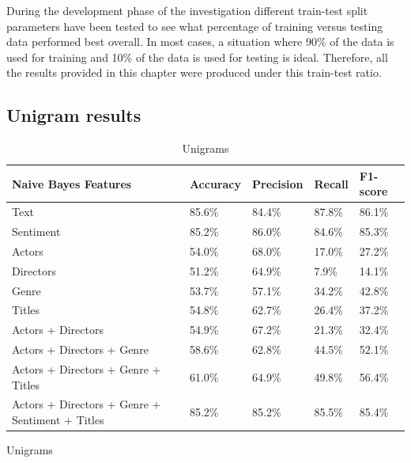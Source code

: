 \documentclass[
10pt, %
a4paper, %
oneside, %
headinclude,footinclude, %
] {book}%
\begin{document}
During the development phase of the investigation different train-test split parameters have been tested to see what percentage of training versus testing data performed best overall. In most cases, a situation where 90\% of the data is used for training and 10\% of the data is used for testing is ideal. Therefore, all the results provided in this chapter were produced under this train-test ratio.

\subsection{Unigram results}

\begin{table}[hbtp]
\centering
\caption{Unigrams}
\label{Table 1}
\begin{tabular}{@{}lllll@{}}
\toprule
Naive Bayes Features                          & Accuracy & Precision & Recall & F1-score \\ \midrule
Text                              & 85.6\%       & 84.4\%          & 87.8\%       & 86.1\%         \\
Sentiment                         & 85.2\%         & 86.0\%          & 84.6\%       & 85.3\%         \\
Actors                            & 54.0\%         & 68.0\%          & 17.0\%       & 27.2\%         \\
Directors                         & 51.2\%         & 64.9\%          & 7.9\%       & 14.1\%         \\
Genre                             & 53.7\%         & 57.1\%          & 34.2\%       & 42.8\%         \\
Titles                            & 54.8\%         & 62.7\%          & 26.4\%       & 37.2\%         \\
Actors + Directors                        & 54.9\%         & 67.2\%          & 21.3\%       & 32.4\%         \\
Actors + Directors + Genre                        & 58.6\%         & 62.8\%          & 44.5\%       & 52.1\%         \\
Actors + Directors + Genre + Titles                       & 61.0\%         & 64.9\%          & 49.8\%       & 56.4\%          \\
Actors + Directors + Genre + Sentiment + Titles                    & 85.2\%          & 85.2\%          & 85.5\%       & 85.4\%         \\ 
\end{tabular}
\begin{tabular}{@{}lllll@{}}

\end{tabular}
\end{table}
\end{document}
